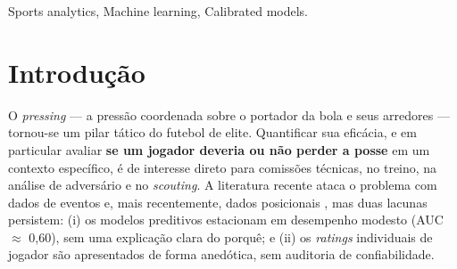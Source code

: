 \documentclass[a4paper,11pt]{article}
\begin{document}
\vspace{8mm}

\begin{abstract}
Assessing whether a player should or should not lose possession under pressure is central to tactical football analysis. We propose \emph{xR} (Expected Recovery), the calibrated probability that the pressing team regains the ball, estimated from StatsBomb-360 data. Adopting the spatially-restricted target already present in the literature (recovery within 5\,s and 5\,m), we show a \textbf{dose-response} relationship: the informativeness of player geometry \emph{grows} as the target is localized (geometry-only AUC from 0.59 to 0.68), and \textbf{no architecture} (GNN, CNN, Set Transformer) beats a loose target ($\approx$0.59). We explain the mechanism: 76\% of within-10\,s recoveries occur too far or too late (median 13\,m) to be caused by the press. A \textbf{light, calibrated} logistic regression (ECE 0.003) matches heavy models and enables aggregate uses: opponent analysis, training, scouting and post-match review (xR \emph{vs.} actual). We honestly delimit scope: individual player ratings have reliability $\approx$0.09, unfit for individual verdicts.
\end{abstract}

\bigskip
\begin{keywords}
Sports analytics, Machine learning, Calibrated models.

\bigskip
{}
\end{keywords}

\section{Introdução}

O \emph{pressing} --- a pressão coordenada sobre o portador da bola e seus arredores --- tornou-se um pilar tático do futebol de elite. Quantificar sua eficácia, e em particular avaliar \textbf{se um jogador deveria ou não perder a posse} em um contexto específico, é de interesse direto para comissões técnicas, no treino, na análise de adversário e no \emph{scouting}. A literatura recente ataca o problema com dados de eventos e, mais recentemente, dados posicionais \citep{robberechts2019,merckx2021,lee2025express}, mas duas lacunas persistem: (i) os modelos preditivos estacionam em desempenho modesto (AUC $\approx$ 0,60), sem uma explicação clara do porquê; e (ii) os \emph{ratings} individuais de jogador são apresentados de forma anedótica, sem auditoria de confiabilidade.
\end{document}
